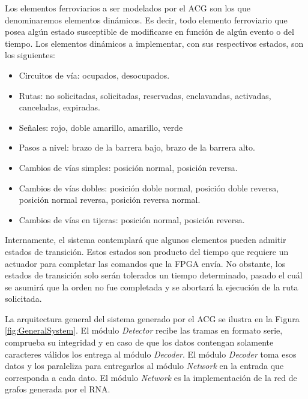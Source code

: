 	Los elementos ferroviarios a ser modelados por el ACG son los que denominaremos elementos dinámicos. Es decir, todo elemento ferroviario que posea algún estado susceptible de modificarse en función de algún evento o del tiempo. Los elementos dinámicos a implementar, con sus respectivos estados, son los siguientes:
	
	\begin{itemize}
		\item Circuitos de vía: ocupados, desocupados.
		\item Rutas: no solicitadas, solicitadas, reservadas, enclavandas, activadas, canceladas, expiradas.
		\item Señales: rojo, doble amarillo, amarillo, verde
		\item Pasos a nivel: brazo de la barrera bajo, brazo de la barrera alto.
		\item Cambios de vías simples: posición normal, posición reversa.
		\item Cambios de vías dobles: posición doble normal, posición doble reversa, posición normal reversa, posición reversa normal.
		\item Cambios de vías en tijeras: posición normal, posición reversa.
	\end{itemize}
	
	Internamente, el sistema contemplará que algunos elementos pueden admitir estados de transición. Estos estados son producto del tiempo que requiere un actuador para completar las comandos que la FPGA envía. No obstante, los estados de transición solo serán tolerados un tiempo determinado, pasado el cuál se asumirá que la orden no fue completada y se abortará la ejecución de la ruta solicitada.
	
	La arquitectura general del sistema generado por el ACG se ilustra en la Figura \ref{fig:GeneralSystem}. El módulo \textit{Detector} recibe las tramas en formato serie, comprueba su integridad y en caso de que los datos contengan solamente caracteres válidos los entrega al módulo \textit{Decoder}. El módulo \textit{Decoder} toma esos datos y los paraleliza para entregarlos al módulo \textit{Network} en la entrada que corresponda a cada dato. El módulo \textit{Network} es la implementación de la red de grafos generada por el RNA. 
	
